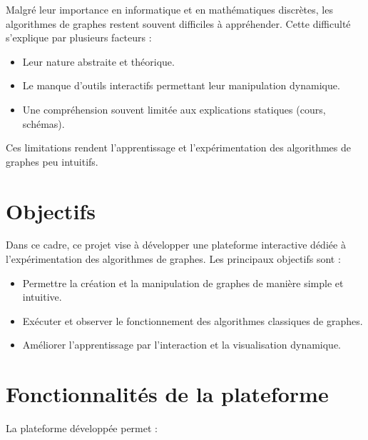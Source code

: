 \documentclass[a4paper,12pt]{report}
\begin{document}
Malgré leur importance en informatique et en mathématiques discrètes, les algorithmes de graphes restent souvent difficiles à appréhender. Cette difficulté s'explique par plusieurs facteurs :

\begin{itemize}
    \item Leur nature abstraite et théorique.
    \item Le manque d'outils interactifs permettant leur manipulation dynamique.
    \item Une compréhension souvent limitée aux explications statiques (cours, schémas).
\end{itemize}

Ces limitations rendent l'apprentissage et l'expérimentation des algorithmes de graphes peu intuitifs.

\section{Objectifs}

Dans ce cadre, ce projet vise à développer une plateforme interactive dédiée à l'expérimentation des algorithmes de graphes. Les principaux objectifs sont :

\begin{itemize}
    \item Permettre la création et la manipulation de graphes de manière simple et intuitive.
    \item Exécuter et observer le fonctionnement des algorithmes classiques de graphes.
    \item Améliorer l'apprentissage par l'interaction et la visualisation dynamique.
\end{itemize}


\section{Fonctionnalités de la plateforme}

La plateforme développée permet :
\end{document}
